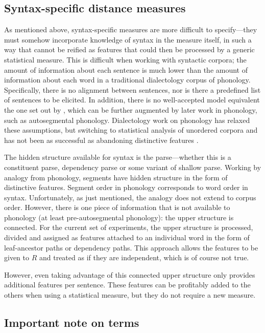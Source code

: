 \subsection{Syntax-specific distance measures}

As mentioned above, syntax-specific measures are more difficult to
specify---they must somehow incorporate knowledge of syntax in the
measure itself, in such a way that cannot be reified as features that
could then be processed by a generic statistical measure. This is
difficult when working with syntactic corpora; the amount of
information about each sentence is much lower than the amount of
information about each word in a traditional dialectology corpus of
phonology. Specifically, there is no alignment between sentences, nor is
there a predefined list of sentences to be elicited. In addition,
there is no well-accepted model equivalent the one set out by
, which can be further augmented by later work in
phonology, such as  autosegmental
phonology. Dialectology work on phonology has relaxed these
assumptions, but switching to statistical analysis of unordered
corpora \cite{sanders06} and \cite{hinrichs07} has not
been as successful as abandoning distinctive features \cite{heeringa04}.

The hidden structure available for syntax is the parse---whether this
is a constituent parse, dependency parse or some variant of shallow
parse. Working by analogy from phonology, segments have hidden
structure in the form of distinctive features. Segment order in
phonology corresponds to word order in syntax. Unfortunately, as just
mentioned, the analogy does not extend to corpus order. However, there
is one piece of information that is not available to phonology (at
least pre-autosegmental phonology): the upper structure is
connected. For the current set of experiments, the upper structure is
processed, divided and assigned as features attached to an individual
word in the form of leaf-ancestor paths or dependency paths. This
approach allows the features to be given to $R$ and treated as if they
are independent, which is of course not true.

However, even taking advantage of this connected upper structure only
provides additional features per sentence. These features can be
profitably added to the others when using a statistical measure, but
they do not require a new measure.

\subsection{Important note on terms}

